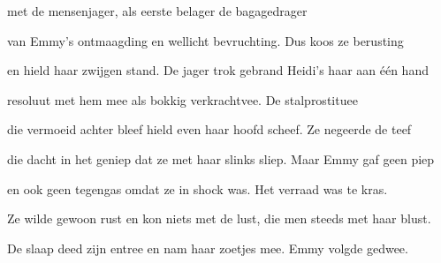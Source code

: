 met de mensenjager,
als eerste belager
de bagagedrager

van Emmy’s ontmaagding
en wellicht bevruchting.
Dus koos ze berusting

en hield haar zwijgen stand.
De jager trok gebrand
Heidi’s haar aan één hand

resoluut met hem mee
als bokkig verkrachtvee.
De stalprostituee

die vermoeid achter bleef
hield even haar hoofd scheef.
Ze negeerde de teef

die dacht in het geniep
dat ze met haar slinks sliep.
Maar Emmy gaf geen piep

en ook geen tegengas
omdat ze in shock was.
Het verraad was te kras.

Ze wilde gewoon rust
en kon niets met de lust,
die men steeds met haar blust.

De slaap deed zijn entree
en nam haar zoetjes mee.
Emmy volgde gedwee.
